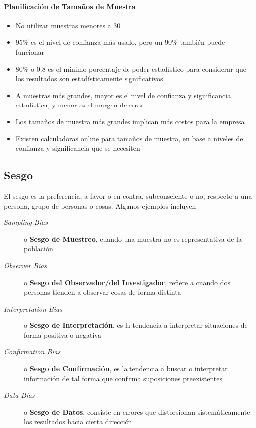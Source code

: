\paragraph{Planificación de Tamaños de Muestra}
\begin{itemize}
    \item {No utilizar muestras menores a 30}
    \item {95\% es el nivel de confianza más usado, pero un 90\% también puede funcionar}
    \item {80\% o 0.8 es el mínimo porcentaje de poder estadístico para considerar que los resultados son estadísticamente significativos}
    \item {A muestras más grandes, mayor es el nivel de confianza y significancia estadística, y menor es el margen de error}
    \item {Los tamaños de muestra más grandes implican más costos para la empresa}
    \item {Existen calculadoras online para tamaños de muestra, en base a niveles de confianza y significancia que se necesiten}
\end{itemize}

\subsection{Sesgo}
El sesgo es la preferencia, a favor o en contra, subconsciente o no, respecto a una persona, grupo de personas o cosas. Algunos ejemplos incluyen 
    \begin{description}
        \item [\textit{Sampling Bias}]{ o \textbf{Sesgo de Muestreo}, cuando una muestra no es representativa de la población}
        \item [\textit{Observer Bias}]{ o \textbf{Sesgo del Observador/del Investigador}, refiere a cuando dos personas tienden a observar cosas de forma distinta}
        \item [\textit{Interpretation Bias}]{o \textbf{Sesgo de Interpretación}, es la tendencia a interpretar situaciones de forma positiva o negativa}
        \item [\textit{Confirmation Bias}]{ o \textbf{Sesgo de Confirmación}, es la tendencia a buscar o interpretar información de tal forma que confirma suposiciones preexistentes}
        \item [\textit{Data Bias}]{ o \textbf{Sesgo de Datos}, consiste en errores que distorsionan sistemáticamente los resultados hacia cierta dirección}
    \end{description}

\newpage